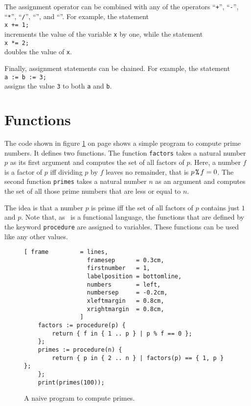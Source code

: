 The assignment operator can be combined with any of the operators 
``\texttt{+}'',
``\texttt{-}'',
``\texttt{*}'',
``\texttt{/}'',
``\texttt{}'', and 
``\texttt{}''.
For example, the statement
\\[0.2cm]
\hspace*{1.3cm}
\texttt{x += 1;}
\\[0.2cm]
increments the value of the variable \texttt{x} by one,  while the statement
\\[0.2cm]
\hspace*{1.3cm}
\texttt{x *= 2;}
\\[0.2cm]
doubles the value of \texttt{x}.   

Finally,
assignment statements can be chained.  For example, the statement
\\[0.2cm]
\hspace*{1.3cm}
\texttt{a := b := 3;}
\\[0.2cm]
assigns the value \texttt{3} to both  \texttt{a} and \texttt{b}.

\section{Functions}
The code shown in figure
\ref{fig:primes-slim.stlx} on page \pageref{fig:primes-slim.stlx} shows a simple program
to compute prime numbers.  It defines two functions.  The function \texttt{factors} takes a
natural number $p$ as its first argument and computes the set of all factors of $p$.  Here, a number
$f$ is a factor of $p$ iff dividing $p$ by $f$ leaves no remainder, that is 
$p \,\texttt{\symbol{37}}\, f = 0$.
The second function \texttt{primes} takes a natural number $n$ as an argument and computes the
set of all those prime numbers that are less or equal to $n$.  

The idea is that a number $p$ is prime
iff the set of all  factors of $p$ contains just $1$ and $p$.  
Note that, as \setlx\ is a functional language, the functions that are defined by the
keyword \texttt{procedure}  are assigned to variables.  These functions can be used like
any other values.


\begin{figure}[!ht]
\centering
\begin{Verbatim}[ frame         = lines, 
                  framesep      = 0.3cm, 
                  firstnumber   = 1,
                  labelposition = bottomline,
                  numbers       = left,
                  numbersep     = -0.2cm,
                  xleftmargin   = 0.8cm,
                  xrightmargin  = 0.8cm,
                ]
    factors := procedure(p) {
        return { f in { 1 .. p } | p % f == 0 };
    };
    primes := procedure(n) {
        return { p in { 2 .. n } | factors(p) == { 1, p } };
    };
    print(primes(100));
\end{Verbatim}
\vspace*{-0.3cm}
\caption{A naive program to compute primes.}
\label{fig:primes-slim.stlx}
\end{figure}

